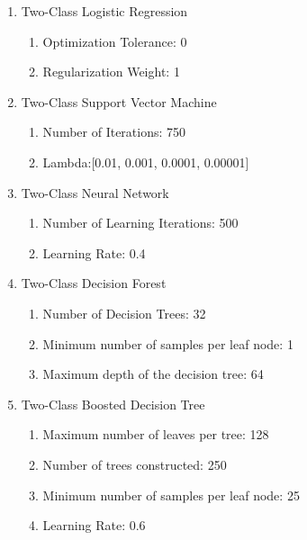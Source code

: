 \begin{enumerate}
    \item{Two-Class Logistic Regression}
    
    \begin{enumerate}
        \item{Optimization Tolerance:} 0
        \item{Regularization Weight:} 1
    \end{enumerate}
    
    \item{Two-Class Support Vector Machine}
    
    \begin{enumerate}
        \item{Number of Iterations:} 750
        \item{Lambda:}[0.01, 0.001, 0.0001, 0.00001]
    \end{enumerate}
    
    \item{Two-Class Neural Network}
    
    \begin{enumerate}
        \item{Number of Learning Iterations:} 500
        \item{Learning Rate:}  0.4
    \end{enumerate}
    
    \item{Two-Class Decision Forest}

    \begin{enumerate}
        \item{Number of Decision Trees:} 32
        \item{Minimum number of samples per leaf node:} 1
        \item{Maximum depth of the decision tree:} 64
    \end{enumerate}
    
    \item{Two-Class Boosted Decision Tree}
    
    \begin{enumerate}
        \item{Maximum number of leaves per tree:} 128
        \item{Number of trees constructed:} 250
        \item{Minimum number of samples per leaf node:} 25
        \item{Learning Rate:}  0.6
    \end{enumerate}
    
\end{enumerate}


